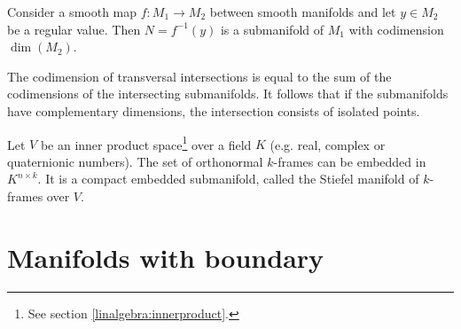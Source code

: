     \begin{theorem}
        Consider a smooth map $f:M_1\rightarrow M_2$ between smooth manifolds and let $y\in M_2$ be a regular value. Then $N=f^{-1}(y)$ is a submanifold of $M_1$ with codimension $\dim(M_2)$.
    \end{theorem}


    \begin{property}
        The codimension of transversal intersections is equal to the sum of the codimensions of the intersecting submanifolds. It follows that if the submanifolds have complementary dimensions, the intersection consists of isolated points.
    \end{property}

    \begin{example}
        Let $V$ be an inner product space\footnote{See section \ref{linalgebra:innerproduct}.} over a field $K$ (e.g. real, complex or quaternionic numbers). The set of orthonormal $k$-frames can be embedded in $K^{n\times k}$. It is a compact embedded submanifold, called the Stiefel manifold of $k$-frames over $V$.
    \end{example}

\section{Manifolds with boundary}\label{section:manifold_boundary}

